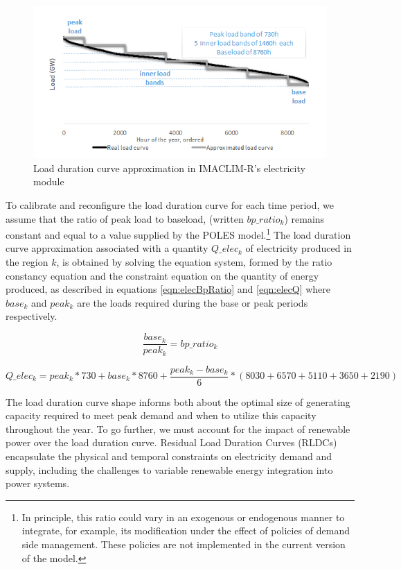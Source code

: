 \begin{figure}
    \includegraphics{figures&tables/LDC.png}
    \caption{Load duration curve approximation in IMACLIM-R's electricity module}
    \centering
    \label{fig:LDC}
\end{figure}


To calibrate and reconfigure the load duration curve for each time period, we assume that the ratio of peak load to baseload, (written $bp\_ratio_k$) remains constant and equal to a value supplied by the POLES model.\footnote{
    In principle, this ratio could vary in an exogenous or endogenous manner to integrate, for example, its modification under the effect of policies of demand side management. These policies are not implemented in the current version of the model.
}
The load duration curve approximation associated with a quantity $Q\_elec_k$ of electricity produced in the region $k$, is obtained by solving the equation system, formed by the ratio constancy equation and the constraint equation on the quantity of energy produced, as described in equations \ref{eqn:elecBpRatio} and  \ref{eqn:elecQ}
where $base_k$ and $peak_k$ are the loads required during the base or peak periods respectively.

\begin{dmath}
    \frac{base_k}{peak_k} = bp\_ratio_k
    \label{eqn:elecBpRatio}
\end{dmath}

\begin{dmath}
    Q\_elec_k =
    peak_k * 730 +
    base_k * 8760 + \frac{peak_k - base_k}{6} * ( 8030 + 6570 + 5110 + 3650 + 2190)
    \label{eqn:elecQ}
\end{dmath}

The load duration curve shape informs both about the optimal size of generating capacity required to meet peak demand and when to utilize this capacity throughout the year. To go further, we must account for the impact of renewable power over the load duration curve. Residual Load Duration Curves (RLDCs) encapsulate the physical and temporal constraints on electricity demand and supply, including the challenges to variable renewable energy integration into power systems.

